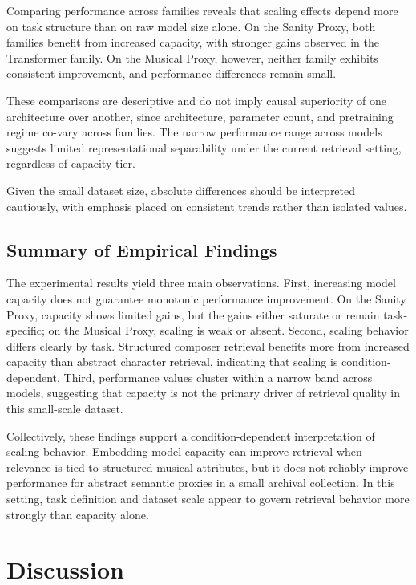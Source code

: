 \documentclass{article}
\begin{document}
Comparing performance across families reveals that scaling effects depend more on task structure
than on raw model size alone. On the Sanity Proxy, both families benefit from increased capacity,
with stronger gains observed in the Transformer family. On the Musical Proxy, however, neither
family exhibits consistent improvement, and performance differences remain small.

These comparisons are descriptive and do not imply causal superiority of one architecture over
another, since architecture, parameter count, and pretraining regime co-vary across families.
The narrow performance range across models suggests limited representational separability under
the current retrieval setting, regardless of capacity tier.

Given the small dataset size, absolute differences should be interpreted cautiously, with emphasis placed on consistent trends rather than isolated values.

\subsection{Summary of Empirical Findings}

The experimental results yield three main observations. First, increasing model capacity does not
guarantee monotonic performance improvement. On the Sanity Proxy, capacity shows limited gains, but
the gains either saturate or remain task-specific; on the Musical Proxy, scaling is weak or absent.
Second, scaling behavior differs clearly by task. Structured composer retrieval benefits more from
increased capacity than abstract character retrieval, indicating that scaling is condition-dependent.
Third, performance values cluster within a narrow band across models, suggesting that capacity is not
the primary driver of retrieval quality in this small-scale dataset.

Collectively, these findings support a condition-dependent interpretation of scaling behavior.
Embedding-model capacity can improve retrieval when relevance is tied to structured musical
attributes, but it does not reliably improve performance for abstract semantic proxies in a small
archival collection. In this setting, task definition and dataset scale appear to govern retrieval
behavior more strongly than capacity alone.








\section{Discussion}
\end{document}
